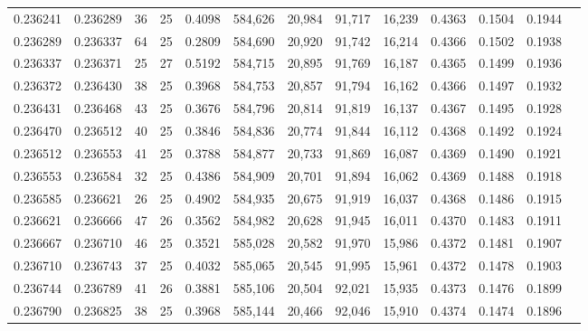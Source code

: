 \begin{tabular}{rrrrrrrrrrrrr}
0.236241 & 0.236289 &    36 &  25 &                                     0.4098 & 584,626 &  20,984 &  91,717 &  16,239 & 0.4363 & 0.1504 & 0.1944 \\
0.236289 & 0.236337 &    64 &  25 &                                     0.2809 & 584,690 &  20,920 &  91,742 &  16,214 & 0.4366 & 0.1502 & 0.1938 \\
0.236337 & 0.236371 &    25 &  27 &                                     0.5192 & 584,715 &  20,895 &  91,769 &  16,187 & 0.4365 & 0.1499 & 0.1936 \\
0.236372 & 0.236430 &    38 &  25 &                                     0.3968 & 584,753 &  20,857 &  91,794 &  16,162 & 0.4366 & 0.1497 & 0.1932 \\
0.236431 & 0.236468 &    43 &  25 &                                     0.3676 & 584,796 &  20,814 &  91,819 &  16,137 & 0.4367 & 0.1495 & 0.1928 \\
0.236470 & 0.236512 &    40 &  25 &                                     0.3846 & 584,836 &  20,774 &  91,844 &  16,112 & 0.4368 & 0.1492 & 0.1924 \\
0.236512 & 0.236553 &    41 &  25 &                                     0.3788 & 584,877 &  20,733 &  91,869 &  16,087 & 0.4369 & 0.1490 & 0.1921 \\
0.236553 & 0.236584 &    32 &  25 &                                     0.4386 & 584,909 &  20,701 &  91,894 &  16,062 & 0.4369 & 0.1488 & 0.1918 \\
0.236585 & 0.236621 &    26 &  25 &                                     0.4902 & 584,935 &  20,675 &  91,919 &  16,037 & 0.4368 & 0.1486 & 0.1915 \\
0.236621 & 0.236666 &    47 &  26 &                                     0.3562 & 584,982 &  20,628 &  91,945 &  16,011 & 0.4370 & 0.1483 & 0.1911 \\
0.236667 & 0.236710 &    46 &  25 &                                     0.3521 & 585,028 &  20,582 &  91,970 &  15,986 & 0.4372 & 0.1481 & 0.1907 \\
0.236710 & 0.236743 &    37 &  25 &                                     0.4032 & 585,065 &  20,545 &  91,995 &  15,961 & 0.4372 & 0.1478 & 0.1903 \\
0.236744 & 0.236789 &    41 &  26 &                                     0.3881 & 585,106 &  20,504 &  92,021 &  15,935 & 0.4373 & 0.1476 & 0.1899 \\
0.236790 & 0.236825 &    38 &  25 &                                     0.3968 & 585,144 &  20,466 &  92,046 &  15,910 & 0.4374 & 0.1474 & 0.1896 \\

\end{tabular}
